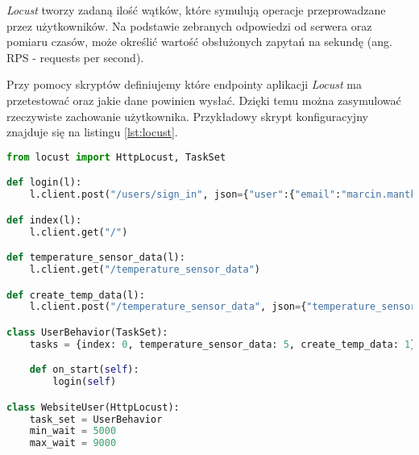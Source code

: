 \emph{Locust} tworzy zadaną ilość wątków, które symulują operacje przeprowadzane przez użytkowników. Na podstawie zebranych odpowiedzi od serwera oraz pomiaru czasów, może określić wartość obsłużonych zapytań na sekundę (ang. RPS - requests per second).

Przy pomocy skryptów definiujemy które endpointy aplikacji \emph{Locust} ma przetestować oraz jakie dane powinien wysłać. Dzięki temu można zasymulować rzeczywiste zachowanie użytkownika. Przykładowy skrypt konfiguracyjny znajduje się na listingu \ref{lst:locust}.

\begin{lstlisting}[caption={Przykładowy plik konfiguracyjny narzędzia Locust.},label={lst:locust},language=Python]
from locust import HttpLocust, TaskSet

def login(l):
    l.client.post("/users/sign_in", json={"user":{"email":"marcin.mantke@gmail.com", "password":"password"}})

def index(l):
    l.client.get("/")

def temperature_sensor_data(l):
    l.client.get("/temperature_sensor_data")

def create_temp_data(l):
    l.client.post("/temperature_sensor_data", json={"temperature_sensor_datum": {"sensor_id": "1", "utc_timestamp": "1496005043", "value": "2"}})

class UserBehavior(TaskSet):
    tasks = {index: 0, temperature_sensor_data: 5, create_temp_data: 1}

    def on_start(self):
        login(self)

class WebsiteUser(HttpLocust):
    task_set = UserBehavior
    min_wait = 5000
    max_wait = 9000
\end{lstlisting}
